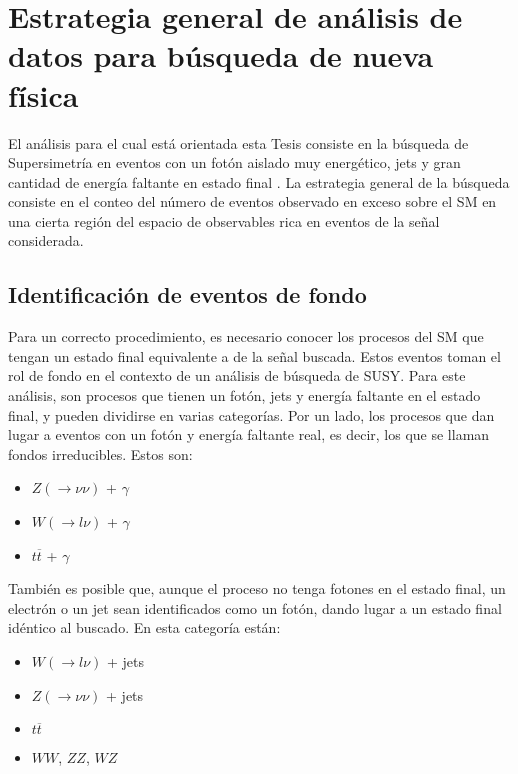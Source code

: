 \chapter{Estrategia general de análisis de datos para búsqueda de nueva física}



El análisis para el cual está orientada esta Tesis consiste en la búsqueda de Supersimetría en eventos con un fotón aislado muy energético, jets y gran cantidad de energía faltante en estado final \cite{Alonso:2147473,ATLAS:2016fks,Collaboration:2198651}. La estrategia general de la búsqueda consiste en el conteo del número de eventos observado en exceso sobre el SM en una cierta región del espacio de observables rica en eventos de la señal considerada.


\section{Identificación de eventos de fondo}

Para un correcto procedimiento, es necesario conocer los procesos del SM que tengan un estado final equivalente a de la señal buscada. Estos eventos toman el rol de fondo en el contexto de un análisis de búsqueda de SUSY. Para este análisis, son procesos que tienen un fotón, jets y energía faltante en el estado final, y pueden dividirse en varias categorías. Por un lado, los procesos que dan lugar a eventos con un fotón y energía faltante real, es decir, los que se llaman fondos irreducibles. Estos son:

\begin{itemize}

	\item $Z(\rightarrow \nu\nu)$ + $\gamma$

	\item $W (\rightarrow l\nu)$ + $\gamma$

	\item $t \overline{t}$ + $\gamma$

\end{itemize}

También es posible que, aunque el proceso no tenga fotones en el estado final, un electrón o un jet sean identificados como un fotón, dando lugar a un estado final idéntico al buscado. En esta categoría están:

\begin{itemize}

	\item $W (\rightarrow l\nu)$ + jets

	\item $Z (\rightarrow \nu\nu)$ + jets

	\item $t \overline{t}$

	\item $WW$, $ZZ$, $WZ$

\end{itemize}

